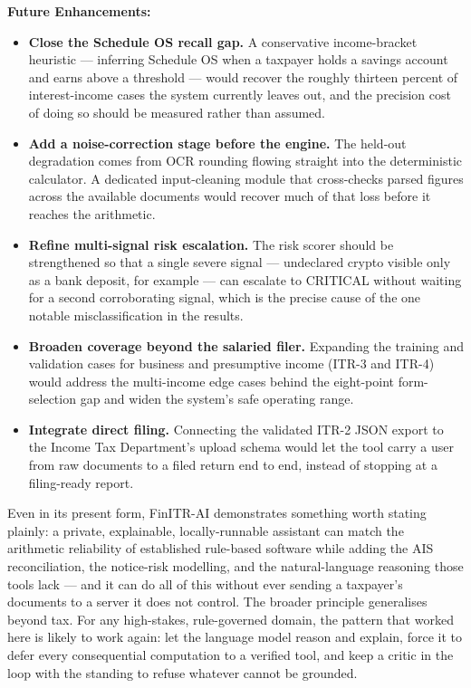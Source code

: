 \noindent\textbf{Future Enhancements:}

\begin{itemize}
    \item \textbf{Close the Schedule OS recall gap.} A conservative
          income-bracket heuristic --- inferring Schedule OS when a taxpayer
          holds a savings account and earns above a threshold --- would recover
          the roughly thirteen percent of interest-income cases the system
          currently leaves out, and the precision cost of doing so should be
          measured rather than assumed.
    \item \textbf{Add a noise-correction stage before the engine.} The held-out
          degradation comes from OCR rounding flowing straight into the
          deterministic calculator. A dedicated input-cleaning module that
          cross-checks parsed figures across the available documents would
          recover much of that loss before it reaches the arithmetic.
    \item \textbf{Refine multi-signal risk escalation.} The risk scorer should
          be strengthened so that a single severe signal --- undeclared crypto
          visible only as a bank deposit, for example --- can escalate to
          CRITICAL without waiting for a second corroborating signal, which is
          the precise cause of the one notable misclassification in the results.
    \item \textbf{Broaden coverage beyond the salaried filer.} Expanding the
          training and validation cases for business and presumptive income
          (ITR-3 and ITR-4) would address the multi-income edge cases behind the
          eight-point form-selection gap and widen the system's safe operating
          range.
    \item \textbf{Integrate direct filing.} Connecting the validated ITR-2 JSON
          export to the Income Tax Department's upload schema would let the tool
          carry a user from raw documents to a filed return end to end, instead
          of stopping at a filing-ready report.
\end{itemize}

Even in its present form, FinITR-AI demonstrates something worth stating plainly:
a private, explainable, locally-runnable assistant can match the arithmetic
reliability of established rule-based software while adding the AIS
reconciliation, the notice-risk modelling, and the natural-language reasoning
those tools lack --- and it can do all of this without ever sending a taxpayer's
documents to a server it does not control. The broader principle generalises
beyond tax. For any high-stakes, rule-governed domain, the pattern that worked
here is likely to work again: let the language model reason and explain, force it
to defer every consequential computation to a verified tool, and keep a critic in
the loop with the standing to refuse whatever cannot be grounded.
